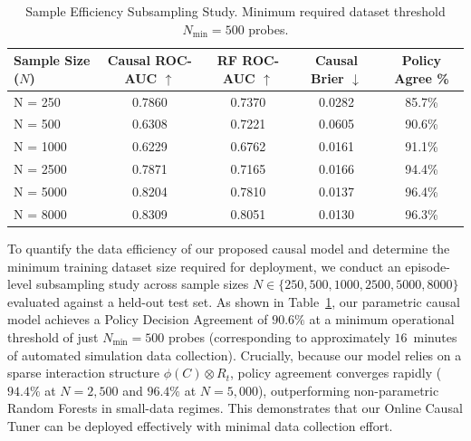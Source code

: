 \begin{table}[t]
\centering
\caption{Sample Efficiency Subsampling Study. Minimum required dataset threshold $N_{\min} = 500$ probes.}
\label{tab:data_efficiency}
\footnotesize
\begin{tabularx}{\columnwidth}{@{}X c c c c@{}}
\toprule
\textbf{Sample Size ($N$)} & \textbf{Causal ROC-AUC $\uparrow$} & \textbf{RF ROC-AUC $\uparrow$} & \textbf{Causal Brier $\downarrow$} & \textbf{Policy Agree \%} \\
\midrule
N = 250 & 0.7860 & 0.7370 & 0.0282 & 85.7\% \\
N = 500 & 0.6308 & 0.7221 & 0.0605 & 90.6\% \\
N = 1000 & 0.6229 & 0.6762 & 0.0161 & 91.1\% \\
N = 2500 & 0.7871 & 0.7165 & 0.0166 & 94.4\% \\
N = 5000 & 0.8204 & 0.7810 & 0.0137 & 96.4\% \\
N = 8000 & 0.8309 & 0.8051 & 0.0130 & 96.3\% \\
\bottomrule
\end{tabularx}
\end{table}
To quantify the data efficiency of our proposed causal model and determine the minimum training dataset size required for deployment, we conduct an episode-level subsampling study across sample sizes $N \in \{250, 500, 1000, 2500, 5000, 8000\}$ evaluated against a held-out test set. As shown in Table~\ref{tab:data_efficiency}, our parametric causal model achieves a Policy Decision Agreement of $90.6\%$ at a minimum operational threshold of just $N_{\min} = 500$ probes (corresponding to approximately $16$~minutes of automated simulation data collection). 
Crucially, because our model relies on a sparse interaction structure $\phi(C) \otimes R_t$, policy agreement converges rapidly ($94.4\%$ at $N = 2,500$ and $96.4\%$ at $N = 5,000$), outperforming non-parametric Random Forests in small-data regimes. This demonstrates that our Online Causal Tuner can be deployed effectively with minimal data collection effort.